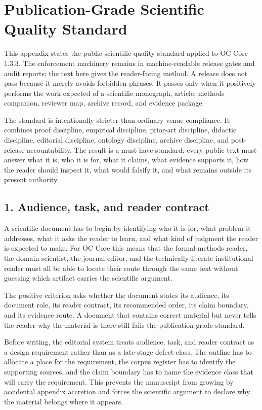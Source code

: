 \section{Publication-Grade Scientific Quality Standard}

\label{sec:oc133-public-scientific-quality-standard}

This appendix states the public scientific quality standard applied to OC Core 1.3.3. The enforcement machinery remains in machine-readable release gates and audit reports; the text here gives the reader-facing method. A release does not pass because it merely avoids forbidden phrases. It passes only when it positively performs the work expected of a scientific monograph, article, methods companion, reviewer map, archive record, and evidence package.


The standard is intentionally stricter than ordinary venue compliance. It combines proof discipline, empirical discipline, prior-art discipline, didactic discipline, editorial discipline, ontology discipline, archive discipline, and post-release accountability. The result is a must-have standard: every public text must answer what it is, who it is for, what it claims, what evidence supports it, how the reader should inspect it, what would falsify it, and what remains outside its present authority.


\subsection{1. Audience, task, and reader contract}

A scientific document has to begin by identifying who it is for, what problem it addresses, what it asks the reader to learn, and what kind of judgment the reader is expected to make. For OC Core this means that the formal-methods reader, the domain scientist, the journal editor, and the technically literate institutional reader must all be able to locate their route through the same text without guessing which artifact carries the scientific argument.


The positive criterion asks whether the document states its audience, its document role, its reader contract, its recommended order, its claim boundary, and its evidence route. A document that contains correct material but never tells the reader why the material is there still fails the publication-grade standard.


Before writing, the editorial system treats audience, task, and reader contract as a design requirement rather than as a late-stage defect class. The outline has to allocate a place for the requirement, the corpus register has to identify the supporting sources, and the claim boundary has to name the evidence class that will carry the requirement. This prevents the manuscript from growing by accidental appendix accretion and forces the scientific argument to declare why the material belongs where it appears.



